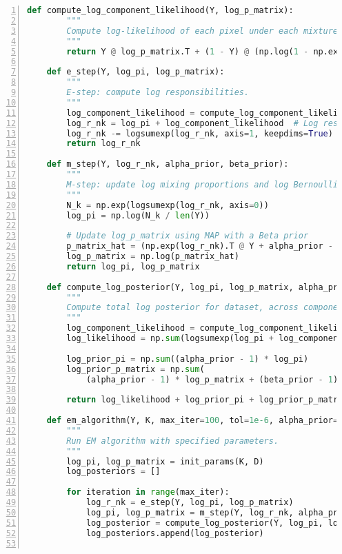 \documentclass{article}
\begin{document}
\begin{enumerate}
\begin{lstlisting}[language=Python, numbers=left, frame=single, breaklines=true, basicstyle=\small]
    def compute_log_component_likelihood(Y, log_p_matrix):
        """
        Compute log-likelihood of each pixel under each mixture component.
        """
        return Y @ log_p_matrix.T + (1 - Y) @ (np.log(1 - np.exp(log_p_matrix))).T 
    
    def e_step(Y, log_pi, log_p_matrix):
        """
        E-step: compute log responsibilities.
        """
        log_component_likelihood = compute_log_component_likelihood(Y, log_p_matrix)
        log_r_nk = log_pi + log_component_likelihood  # Log responsibility numerator
        log_r_nk -= logsumexp(log_r_nk, axis=1, keepdims=True)  # Normalise across components
        return log_r_nk
    
    def m_step(Y, log_r_nk, alpha_prior, beta_prior):
        """
        M-step: update log mixing proportions and log Bernoulli parameters.
        """
        N_k = np.exp(logsumexp(log_r_nk, axis=0))
        log_pi = np.log(N_k / len(Y))
    
        # Update log_p_matrix using MAP with a Beta prior
        p_matrix_hat = (np.exp(log_r_nk).T @ Y + alpha_prior - 1) / (N_k[:, None] + alpha_prior + beta_prior - 2)
        log_p_matrix = np.log(p_matrix_hat)
        return log_pi, log_p_matrix
    
    def compute_log_posterior(Y, log_pi, log_p_matrix, alpha_prior, beta_prior):
        """
        Compute total log posterior for dataset, across components.
        """
        log_component_likelihood = compute_log_component_likelihood(Y, log_p_matrix)
        log_likelihood = np.sum(logsumexp(log_pi + log_component_likelihood, axis=1))
    
        log_prior_pi = np.sum((alpha_prior - 1) * log_pi)
        log_prior_p_matrix = np.sum(
            (alpha_prior - 1) * log_p_matrix + (beta_prior - 1) * np.log(1 - np.exp(log_p_matrix)))
    
        return log_likelihood + log_prior_pi + log_prior_p_matrix
    
    def em_algorithm(Y, K, max_iter=100, tol=1e-6, alpha_prior=1.1, beta_prior=1.1):
        """
        Run EM algorithm with specified parameters.
        """
        log_pi, log_p_matrix = init_params(K, D)
        log_posteriors = []
    
        for iteration in range(max_iter):
            log_r_nk = e_step(Y, log_pi, log_p_matrix)
            log_pi, log_p_matrix = m_step(Y, log_r_nk, alpha_prior, beta_prior)
            log_posterior = compute_log_posterior(Y, log_pi, log_p_matrix, alpha_prior, beta_prior)
            log_posteriors.append(log_posterior)
    

\end{lstlisting}
\end{enumerate}
\end{document}
